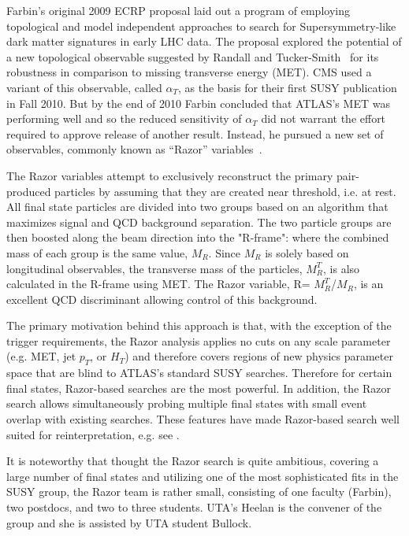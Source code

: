   Farbin's original 2009 ECRP proposal
laid out a program of employing topological and model independent
approaches to search for Supersymmetry-like dark matter signatures in
early LHC data. The proposal explored the potential of a new
topological observable suggested by Randall and
Tucker-Smith~\cite{RTS} for its robustness in comparison to missing
transverse energy (MET). CMS used a variant of this observable, called
$\alpha_T$, as the basis for their first SUSY publication in Fall
2010. But by the end of 2010 Farbin concluded that ATLAS's MET was
performing well and so the reduced sensitivity of $\alpha_T$ did not
warrant the effort required to approve release of another
result. Instead, he pursued a new set of observables, commonly known
as ``Razor'' variables~\cite{Razor}. 

The Razor variables attempt to exclusively reconstruct the primary
pair-produced particles by assuming that they are created near
threshold, i.e. at rest. All final state particles are divided into
two groups based on an algorithm that maximizes signal and QCD
background separation. The two particle groups are then boosted along
the beam direction into the "R-frame": where the combined mass of each
group is the same value, $M_R$. Since $M_R$ is solely based on
longitudinal observables, the transverse mass of the particles,
$M_R^T$, is also calculated in the R-frame using MET. The Razor
variable, R= $M_R^T$/$M_R$, is an excellent QCD discriminant allowing
control of this background. 

The primary motivation behind this approach is that, with the
exception of the trigger requirements, the Razor analysis applies no
cuts on any scale parameter (e.g. MET, jet $p_T$, or $H_T$) and
therefore covers regions of new physics parameter space that are blind
to ATLAS's standard SUSY searches. Therefore for certain final states,
Razor-based searches are the most powerful.  In addition, the Razor
search allows simultaneously probing multiple final states with small
event overlap with existing searches. These features have made
Razor-based search well suited for reinterpretation, e.g. see
\cite{RazorDarkMatter,RazorCompressed}. 

It is noteworthy that thought the Razor search is quite ambitious,
covering a large number of final states and utilizing one of the most
sophisticated fits in the SUSY group, the Razor team is rather
small, consisting of one faculty (Farbin), two postdocs, and two to
three students. UTA's Heelan is the convener of the group and she is
assisted by UTA student Bullock.

